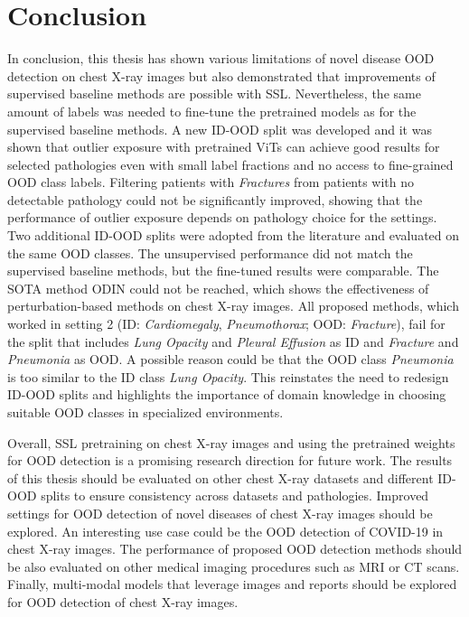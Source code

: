 \section{Conclusion}
In conclusion, this thesis has shown various limitations of novel disease OOD detection on chest X-ray images but also demonstrated that improvements of supervised baseline methods are possible with SSL. 
Nevertheless, the same amount of labels was needed to fine-tune the pretrained models as for the supervised baseline methods.
A new ID-OOD split was developed and it was shown that outlier exposure with pretrained ViTs can achieve good results for selected pathologies even with small label fractions and no access to fine-grained OOD class labels.
Filtering patients with \textit{Fractures} from patients with no detectable pathology could not be significantly improved, showing that the performance of outlier exposure depends on pathology choice for the settings.
Two additional ID-OOD splits were adopted from the literature and evaluated on the same OOD classes.
The unsupervised performance did not match the supervised baseline methods, but the fine-tuned results were comparable.
The SOTA method ODIN could not be reached, which shows the effectiveness of perturbation-based methods on chest X-ray images.
All proposed methods, which worked in setting 2 (ID: \textit{Cardiomegaly}, \textit{Pneumothorax}; OOD: \textit{Fracture}), fail for the split that includes \textit{Lung Opacity} and \textit{Pleural Effusion} as ID and \textit{Fracture} and \textit{Pneumonia} as OOD.
A possible reason could be that the OOD class \textit{Pneumonia} is too similar to the ID class \textit{Lung Opacity}.
This reinstates the need to redesign ID-OOD splits and highlights the importance of domain knowledge in choosing suitable OOD classes in specialized environments.
\par 
Overall, SSL pretraining on chest X-ray images and using the pretrained weights for OOD detection is a promising research direction for future work.
The results of this thesis should be evaluated on other chest X-ray datasets and different ID-OOD splits to ensure consistency across datasets and pathologies.
Improved settings for OOD detection of novel diseases of chest X-ray images should be explored.
An interesting use case could be the OOD detection of COVID-19 in chest X-ray images.
The performance of proposed OOD detection methods should be also evaluated on other medical imaging procedures such as MRI or CT scans.
Finally, multi-modal models that leverage images and reports should be explored for OOD detection of chest X-ray images.
